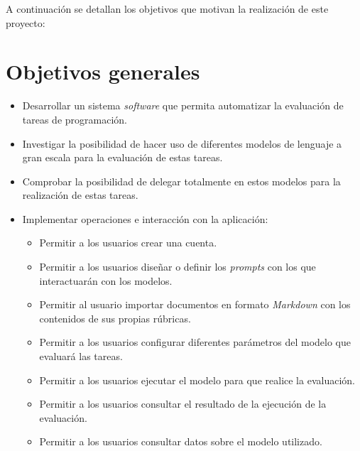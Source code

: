 
A continuación se detallan los objetivos que motivan la realización de este proyecto:

\section{Objetivos generales}\label{objetivos_generales}

\begin{itemize}
    \item Desarrollar un sistema \textit{software} que permita automatizar la evaluación de tareas de programación.
    \item Investigar la posibilidad de hacer uso de diferentes modelos de lenguaje a gran escala para la evaluación de estas tareas.
    \item Comprobar la posibilidad de delegar totalmente en estos modelos para la realización de estas tareas.
    \item Implementar operaciones e interacción con la aplicación:
    \begin{itemize}
        \item Permitir a los usuarios crear una cuenta.
        \item Permitir a los usuarios diseñar o definir los \textit{prompts} con los que interactuarán con los modelos.
        \item Permitir al usuario importar documentos en formato \textit{Markdown} con los contenidos de sus propias rúbricas.
        \item Permitir a los usuarios configurar diferentes parámetros del modelo que evaluará las tareas.
        \item Permitir a los usuarios ejecutar el modelo para que realice la evaluación.
        \item Permitir a los usuarios consultar el resultado de la ejecución de la evaluación.
        \item Permitir a los usuarios consultar datos sobre el modelo utilizado.
    \end{itemize}
\end{itemize}

